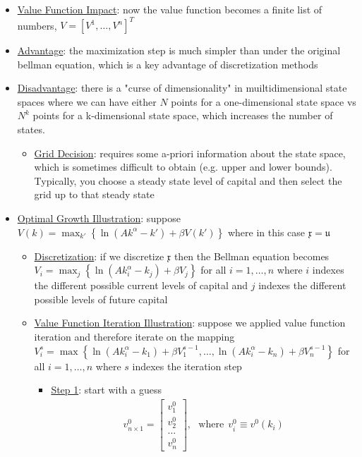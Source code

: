 \documentclass{article}
\begin{document}
\begin{itemize}
    \item \underline{Value Function Impact}: now the value function becomes a finite list of numbers, $V = [V^{1}, \dots, V^{n}]^{T}$
    \item  \underline{Advantage}: the maximization step is much simpler than under the original bellman equation, which is a key advantage of discretization methods
    \item  \underline{Disadvantage}: there is a "curse of dimensionality" in muiltidimensional state spaces where we can have either $N$ points for a one-dimensional state space vs $N^{k}$ points for a k-dimensional state space, which increases the number of states.
    \begin{itemize}
        \item  \underline{Grid Decision}: requires some a-priori information about the state space, which is sometimes difficult to obtain (e.g. upper and lower bounds). Typically, you choose a steady state level of capital and then select the grid up to that steady state
    \end{itemize}
    \item  \underline{Optimal Growth Illustration}: suppose $V(k) = \max_{k'} \left\{ \ln (Ak^{\alpha} - k') + \beta V(k') \right\}$ where in this case $\mathfrak{x} = \mathfrak{u}$
    \begin{itemize}
        \item \underline{Discretization}: if we discretize $\mathfrak{x}$ then the Bellman equation becomes $V_{i} = \max_{j} \left\{ \ln (Ak^{\alpha}_{i} - k_{j}) + \beta V_{j} \right\}$ for all $i = 1, \dots, n$ where $i$ indexes the different possible current levels of capital and $j$ indexes the different possible levels of future capital
        \item \underline{Value Function Iteration Illustration}: suppose we applied value function iteration and therefore iterate on the mapping $V_{i}^{s} = \max \left\{ \ln(Ak^{\alpha}_{i} - k_{1}) + \beta V_{1}^{s-1}, \dots, \ln(Ak_{i}^{\alpha} - k_{n}) + \beta V_{n}^{s-1} \right\}$ for all $i = 1, \dots, n$ where $s$ indexes the iteration step
        \begin{itemize}
            \item \underline{Step 1}: start with a guess
            \begin{gather*}
                v_{n \times 1}^{0} = \begin{bmatrix} v_{1}^{0} \\ v_{2}^{0} \\ \dots \\ v_{n}^{0} \end{bmatrix}, \ \ \ \text{where} \ \ v_{i}^{0} \equiv v^{0}(k_{i})

\end{gather*}
\end{itemize}
\end{itemize}
\end{itemize}
\end{document}
